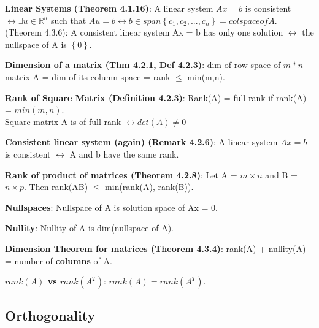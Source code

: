 \documentclass[a4paper,landscape]{article}
\newcommand{\rntopic}[1]{\vspace{-2.0em}\subsection*{#1}\vspace{-1.0em}}
\newcommand{\rnname}[1]{\textbf{#1}}
\begin{document}
\begin{multicols*}{4}
\begin{flatitemize}
\item \rnname{Linear Systems (Theorem 4.1.16)}: A linear system $Ax = b$ is consistent $\leftrightarrow \exists u \in \mathbb{R}^n$ such that $Au = b \leftrightarrow b \in span \left\lbrace c_{1}, c_{2}, ..., c_{n} \right\rbrace = col space of A$. \\
(Theorem 4.3.6): A consistent linear system Ax = b has only one solution $\leftrightarrow$ the nullspace of A is $\left\lbrace 0 \right\rbrace$.
\item \rnname{Dimension of a matrix (Thm 4.2.1, Def 4.2.3)}: dim of row space of $m * n$ matrix A = dim of its column space = rank $\leq$ min(m,n).
\item \rnname{Rank of Square Matrix (Definition 4.2.3)}: Rank(A) = full rank if rank(A) = $min(m,n)$.\\ Square matrix A is of full rank $\leftrightarrow det(A) \neq 0$
\item \rnname{Consistent linear system (again) (Remark 4.2.6)}: A linear system $Ax = b$ is consistent $\leftrightarrow$ A and b have the same rank.
\item \rnname{Rank of product of matrices (Theorem 4.2.8)}: Let A = $m \times n$ and B = $n \times p$. Then rank(AB) $\leq$ min(rank(A), rank(B)).
\item \rnname{Nullspaces}: Nullspace of A is solution space of Ax = 0.
\item \rnname{Nullity}: Nullity of A is dim(nullspace of A).
\item \rnname{Dimension Theorem for matrices (Theorem 4.3.4)}: rank(A) + nullity(A) = number of \textbf{columns} of A.
\item \rnname{$rank(A)$ vs $rank(A^T)$}: $rank(A) = rank(A^T)$. 
\end{flatitemize}

\rntopic{Orthogonality}


\end{multicols*}
\end{document}
